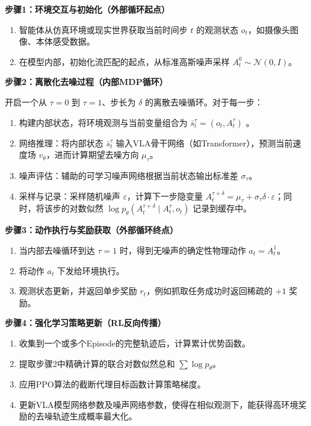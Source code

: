 \textbf{步骤1：环境交互与初始化（外部循环起点）}

\begin{enumerate}
\def\labelenumi{\arabic{enumi}.}
\tightlist
\item
  智能体从仿真环境或现实世界获取当前时间步 \(t\) 的观测状态 \(o_t\)，如摄像头图像、本体感受数据。
\item
  在模型内部，初始化流匹配的起点，从标准高斯噪声采样 \(A_t^0\sim\mathcal{N}(0,I)\)。
\end{enumerate}

\textbf{步骤2：离散化去噪过程（内部MDP循环）}

开启一个从 \(\tau=0\) 到 \(\tau=1\)、步长为 \(\delta\) 的离散去噪循环。对于每一步：

\begin{enumerate}
\def\labelenumi{\arabic{enumi}.}
\tightlist
\item
  构建内部状态，将环境观测与当前变量组合为 \(\bar{s}_t^\tau=(o_t,A_t^\tau)\) 。
\item
  网络推理：将内部状态 \(\bar{s}_t^\tau\) 输入VLA骨干网络（如Transformer），预测当前速度场 \(v_\theta\)，进而计算期望去噪方向 \(\mu_\tau\)。
\item
  噪声评估：辅助的可学习噪声网络根据当前状态输出标准差 \(\sigma_\tau\)。
\item
  采样与记录：采样随机噪声 \(\varepsilon\)，计算下一步隐变量 \(A_t^{\tau+\delta}=\mu_\tau+\sigma_\tau\delta\cdot\varepsilon\)；同时，将该步的对数似然 \(\log p_\theta(A_t^{\tau+\delta}\mid A_t^\tau,o_t)\) 记录到缓存中。
\end{enumerate}

\textbf{步骤3：动作执行与奖励获取（外部循环终点）}

\begin{enumerate}
\def\labelenumi{\arabic{enumi}.}
\tightlist
\item
  当内部去噪循环到达 \(\tau=1\) 时，得到无噪声的确定性物理动作 \(a_t=A_t^1\)。
\item
  将动作 \(a_t\) 下发给环境执行。
\item
  观测状态更新，并返回单步奖励 \(r_t\)，例如抓取任务成功时返回稀疏的 \(+1\) 奖励。
\end{enumerate}

\textbf{步骤4：强化学习策略更新（RL反向传播）}

\begin{enumerate}
\def\labelenumi{\arabic{enumi}.}
\tightlist
\item
  收集到一个或多个Episode的完整轨迹后，计算累计优势函数。
\item
  提取步骤2中精确计算的联合对数似然总和 \(\sum\log p_\theta\)。
\item
  应用PPO算法的截断代理目标函数计算策略梯度。
\item
  更新VLA模型网络参数及噪声网络参数，使得在相似观测下，能获得高环境奖励的去噪轨迹生成概率最大化。
\end{enumerate}


